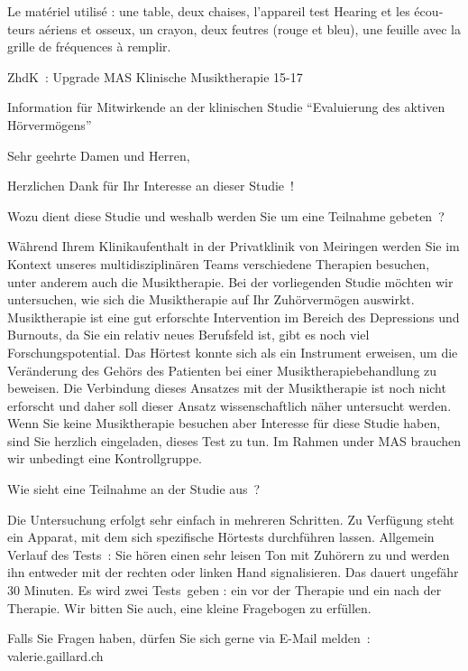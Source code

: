\begin{french}
	Le matériel utilisé : une table, deux chaises, l'appareil
	test Hearing et les écouteurs aériens et osseux, un crayon, deux
	feutres (rouge et bleu), une feuille avec la grille de fréquences à
	remplir.
\end{french}
 

\textgerman{ZhdK : Upgrade MAS Klinische Musiktherapie 15-17}

Information für Mitwirkende an der klinischen Studie
\foreignquote{german}{Evaluierung des aktiven Hörvermögens}


Sehr geehrte Damen und Herren,

Herzlichen Dank für Ihr Interesse an dieser Studie !

Wozu dient diese Studie und weshalb werden Sie um eine Teilnahme gebeten ?

Während Ihrem Klinikaufenthalt  in der Privatklinik von Meiringen werden Sie im Kontext 
unseres multidisziplinären Teams verschiedene Therapien besuchen, unter anderem auch die Musiktherapie. Bei der vorliegenden Studie möchten wir untersuchen, wie sich die Musiktherapie auf Ihr Zuhörvermögen auswirkt.
Musiktherapie ist eine gut erforschte Intervention im Bereich des Depressions und Burnouts, da Sie ein relativ neues Berufsfeld ist, gibt es noch viel Forschungspotential.
Das Hörtest konnte sich als ein Instrument erweisen, um die Veränderung des Gehörs des Patienten bei einer Musiktherapiebehandlung zu beweisen. Die Verbindung dieses Ansatzes mit der Musiktherapie ist noch nicht erforscht und daher soll dieser Ansatz wissenschaftlich näher untersucht werden.
Wenn Sie keine Musiktherapie besuchen aber Interesse für diese Studie haben, sind Sie herzlich eingeladen, dieses Test zu tun. Im Rahmen under MAS brauchen wir unbedingt eine Kontrollgruppe.

Wie sieht eine Teilnahme an der Studie aus ?

Die Untersuchung erfolgt sehr einfach in mehreren Schritten.
Zu Verfügung steht ein Apparat, mit dem sich spezifische Hörtests durchführen lassen.
Allgemein Verlauf des Tests :  
Sie hören einen sehr leisen Ton mit Zuhörern zu und werden ihn entweder mit der rechten  oder linken Hand  signalisieren. Das dauert ungefähr 30 Minuten.
Es wird zwei Tests geben : ein vor der Therapie und ein nach der Therapie.
Wir bitten Sie auch, eine kleine Fragebogen zu erfüllen.


Falls Sie Fragen haben, dürfen Sie sich gerne via E-Mail melden : valerie.gaillard\@gmx.ch

